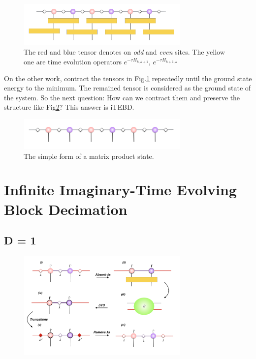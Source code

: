 \begin{figure}[ht]
	\centering
	\includegraphics[width=0.75\textwidth]{figures/fig312.png}
	\caption[The picture of the main idea of itebd.]{The red and blue tensor denotes on \textit{odd} and \textit{even} sites. The yellow one are time evolution operators $e^{-\tau H_{k,k+1}}$, $e^{-\tau H_{k+1,k}}$}
	\label{fig312}
\end{figure}

On the other work, contract the tensors in Fig.\ref{fig312} repeatedly until the ground state energy to the minimum. The remained tensor is considered as the ground state of the system. So the next question: How can we contract them and preserve the structure like Fig{\ref{fig311}}? This answer is iTEBD.

\begin{figure}[ht]
	\centering
	\includegraphics[width=0.75\textwidth]{figures/fig311.png}
	\caption[The picture of matrix product states]{The simple form of a matrix product state.}
	\label{fig311}
\end{figure}

\section{Infinite Imaginary-Time Evolving Block Decimation}
\label{itebd}
\subsection{D = 1}
\label{1ditebd}
	\begin{figure}[ht]
	\centering
	\includegraphics[width=0.75\textwidth]{figures/fig313.png}
	\caption[tmp]{}
	\label{fig313}
	\end{figure}

